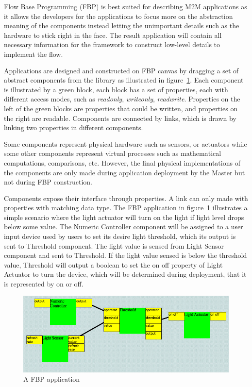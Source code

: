 Flow Base Programming (FBP) is best suited for describing M2M applications as it
allows the developers for the applications to focus more on the
abstraction meaning of the components instead letting the unimportant details
such as the hardware to stick right in the face. The result application will
contain all necessary information for the framework to construct low-level
details to implement the flow.

Applications are designed and constructed on FBP canvas by dragging a set of
abstract components from the library as illustrated in
figure~\ref{fig:fbp-application}. Each component is illustrated by a green
block, each block has a set of properties, each with different access modes,
such as \textit{readonly}, \textit{writeonly}, \textit{readwrite}. Properties on
the left of the green blocks are properties that could be written, and
properties on the right are readable. Components are connected by links, which
is drawn by linking two properties in different components.

Some components represent physical hardware such as sensors, or actuators
while some other components represent virtual processes such as
mathematical computations, comparisons, etc. However, the final physical implementations
of the components are only made during application deployment by the Master but
not during FBP construction.

Components expose their interface through properties. A link can only made with
properties with matching data type. The FBP application in
figure~\ref{fig:fbp-application} illustrates a simple scenario where the light
actuator will turn on the light if light level drops below some value. The
Numeric Controller component will be assigned to a user input device used by
users to set its desire light threshold, which its output is sent to Threshold
component. The light value is sensed from Light Sensor component and sent to
Threshold. If the light value sensed is below the threshold value, Threshold
will output a boolean to set the on off property of Light Actuator to turn the
device, which will be determined during deployment, that it is represented by on
or off.

\begin{figure}[h!]
\centering
    \includegraphics[width=\linewidth]{figures/fbp-application}
\caption{A FBP application}
\label{fig:fbp-application}
\end{figure}

